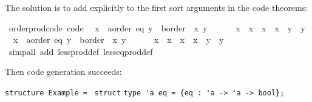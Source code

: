 \begin{isabellebody}
\begin{isamarkuptext}
  The solution is to add  explicitly to the first sort arguments in the
  code theorems:%
\end{isamarkuptext}%
\isamarkuptrue%
%
\isadelimquote
%
\endisadelimquote
%
\isatagquote
{}\isamarkupfalse%
\ order{\isacharunderscore}prod{\isacharunderscore}code\ {\isacharbrackleft}code{\isacharbrackright}{\isacharcolon}\isanewline
\ \ {\isachardoublequoteopen}{\isacharparenleft}x{}\ {\isasymColon}\ {\isacharprime}a{\isasymColon}{\isacharbraceleft}order{\isacharcomma}\ eq{\isacharbraceright}{\isacharcomma}\ y{}\ {\isasymColon}\ {\isacharprime}b{\isasymColon}order{\isacharparenright}\ {\isacharless}\ {\isacharparenleft}x{}{\isacharcomma}\ y{}{\isacharparenright}\ {\isasymlongleftrightarrow}\isanewline
\ \ \ \ \ x{}\ {\isacharless}\ x{}\ {\isasymor}\ x{}\ {\isacharequal}\ x{}\ {\isasymand}\ y{}\ {\isacharless}\ y{}{\isachardoublequoteclose}\isanewline
\ \ {\isachardoublequoteopen}{\isacharparenleft}x{}\ {\isasymColon}\ {\isacharprime}a{\isasymColon}{\isacharbraceleft}order{\isacharcomma}\ eq{\isacharbraceright}{\isacharcomma}\ y{}\ {\isasymColon}\ {\isacharprime}b{\isasymColon}order{\isacharparenright}\ {\isasymle}\ {\isacharparenleft}x{}{\isacharcomma}\ y{}{\isacharparenright}\ {\isasymlongleftrightarrow}\isanewline
\ \ \ \ \ x{}\ {\isacharless}\ x{}\ {\isasymor}\ x{}\ {\isacharequal}\ x{}\ {\isasymand}\ y{}\ {\isasymle}\ y{}{\isachardoublequoteclose}\isanewline
\ \ \isamarkupfalse%
\ {\isacharparenleft}simp{\isacharunderscore}all\ add{\isacharcolon}\ less{\isacharunderscore}prod{\isacharunderscore}def\ less{\isacharunderscore}eq{\isacharunderscore}prod{\isacharunderscore}def{\isacharparenright}%
\endisatagquote
{\isafoldquote}%
%
\isadelimquote
%
\endisadelimquote
%
\begin{isamarkuptext}%
\noindent Then code generation succeeds:%
\end{isamarkuptext}%
\isamarkuptrue%
%
\isadelimquote
%
\endisadelimquote
%
\isatagquote
%
\begin{isamarkuptext}%
\isaverbatim%
\noindent%
\verb|structure Example = |\newline%
\verb|struct|\newline%
\newline%
\verb|type 'a eq = {eq : 'a -> 'a -> bool};|\newline%

\end{isamarkuptext}
\end{isabellebody}
